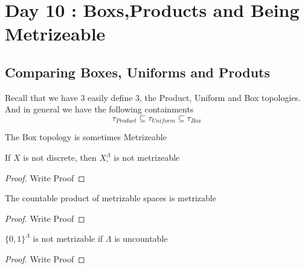 \section{Day 10 : Boxs,Products and Being Metrizeable}
\subsection{Comparing Boxes, Uniforms and Produts}
Recall that we have 3 easily define 3, the Product, Uniform and Box topologies. And in general we have the following containments
\[\tau_{Product}\subseteq\tau_{Uniform}\subseteq\tau_{Box}\]
\begin{remark}
    The Box topology is sometimes Metrizeable
\end{remark}
\begin{theorem}
    If $X$ is not discrete, then $X_{\square}^\Lambda$ is not metrizeable
\end{theorem}
\begin{proof}
    Write Proof
\end{proof}
\begin{theorem}
    The countable product of metrizable spaces is metrizable
\end{theorem}
\begin{proof}
    Write Proof
\end{proof}
\begin{theorem}
    $\{0,1\}^\Lambda$ is not metrizable if $\Lambda$ is uncountable
\end{theorem}
\begin{proof}
    Write Proof
\end{proof}
